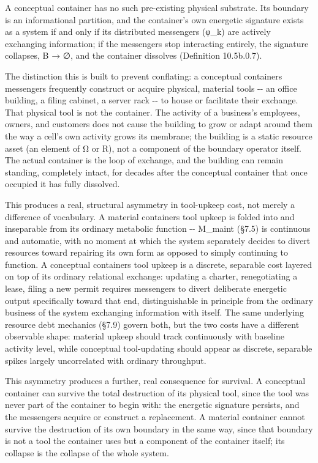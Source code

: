 \documentclass[
]{article}
\begin{document}
A conceptual container has no such pre-existing physical substrate. Its
boundary is an informational partition, and the container's own
energetic signature exists as a system if and only if its distributed
messengers (φ\_k) are actively exchanging information; if the messengers
stop interacting entirely, the signature collapses, B → ∅, and the
container dissolves (Definition 10.5b.0.7).

The distinction this is built to prevent conflating: a conceptual
containers messengers frequently construct or acquire physical, material
tools -\/- an office building, a filing cabinet, a server rack -\/- to
house or facilitate their exchange. That physical tool is not the
container. The activity of a business's employees, owners, and customers
does not cause the building to grow or adapt around them the way a
cell's own activity grows its membrane; the building is a static
resource asset (an element of Ω or R), not a component of the boundary
operator itself. The actual container is the loop of exchange, and the
building can remain standing, completely intact, for decades after the
conceptual container that once occupied it has fully dissolved.

This produces a real, structural asymmetry in tool-upkeep cost, not
merely a difference of vocabulary. A material containers tool upkeep is
folded into and inseparable from its ordinary metabolic function -\/-
M\_maint (§7.5) is continuous and automatic, with no moment at which the
system separately decides to divert resources toward repairing its own
form as opposed to simply continuing to function. A conceptual
containers tool upkeep is a discrete, separable cost layered on top of
its ordinary relational exchange: updating a charter, renegotiating a
lease, filing a new permit requires messengers to divert deliberate
energetic output specifically toward that end, distinguishable in
principle from the ordinary business of the system exchanging
information with itself. The same underlying resource debt mechanics
(§7.9) govern both, but the two costs have a different observable shape:
material upkeep should track continuously with baseline activity level,
while conceptual tool-updating should appear as discrete, separable
spikes largely uncorrelated with ordinary throughput.

This asymmetry produces a further, real consequence for survival. A
conceptual container can survive the total destruction of its physical
tool, since the tool was never part of the container to begin with: the
energetic signature persists, and the messengers acquire or construct a
replacement. A material container cannot survive the destruction of its
own boundary in the same way, since that boundary is not a tool the
container uses but a component of the container itself; its collapse is
the collapse of the whole system.
\end{document}
